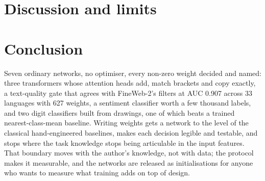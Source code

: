 \documentclass[11pt]{article}
\begin{document}


\section{Discussion and limits}
\label{sec:discussion}


\section{Conclusion}
Seven ordinary networks, no optimiser, every non-zero weight decided and named:
three transformers whose attention heads add, match brackets and copy exactly, a
text-quality gate that agrees with FineWeb-2's filters at AUC 0.907 across 33
languages with 627 weights, a sentiment classifier worth a few thousand labels,
and two digit classifiers built from drawings, one of which beats a trained
nearest-class-mean baseline. Writing weights gets a network to the level of the
classical hand-engineered baselines, makes each decision legible and testable,
and stops where the task knowledge stops being articulable in the input
features. That boundary moves with the author's knowledge, not with data; the
protocol makes it measurable, and the networks are released as initialisations
for anyone who wants to measure what training adds on top of design.



\end{document}

